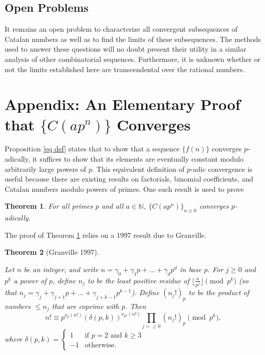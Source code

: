 \documentclass[12pt, letter]{article}    %
\theoremstyle{plain}
\newtheorem{theorem}{Theorem}[section]
\theoremstyle{definition}
\numberwithin{equation}{section}
\newcommand{\thref}[1]{Theorem \ref{#1}}
\newcommand{\propref}[1]{Proposition \ref{#1}}
\newcommand{\thlabel}[1]{\label{#1}}
\begin{document}
\subsection{Open Problems}

It remains an open problem to characterize all convergent subsequences of Catalan numbers as well as to find the limits of these subsequences. The methods used to answer these questions will no doubt present their utility in a similar analysis of other combinatorial sequences. Furthermore, it is unknown whether or not the limits established here are transcendental over the rational numbers.

\section{Appendix: An Elementary Proof that $\{C(ap^n)\}$ Converges}

\propref{eq def} states that to show that a sequence $\{f(n)\}$ converges $p$-adically, it suffices to show that its elements are eventually constant modulo arbitrarily large powers of $p$. This equivalent definition of $p$-adic convergence is useful because there are existing results on factorials, binomial coefficients, and Catalan numbers modulo powers of primes. One such result is used to prove 

\begin{theorem}\thlabel{class thm}
For all primes $p$ and all $a\in\mathbb{N}$, $\{C(ap^n)\}_{n\geq 0}$ converges $p$-adically.
\end{theorem}

\noindent The proof of \thref{class thm} relies on a 1997 result due to Granville.

\begin{theorem}[Granville 1997]\thlabel{granlem1}

Let $n$ be an integer, and write $n=\gamma_0+\gamma_1p+\dots+\gamma_dp^d$ in base $p$. For $j\geq 0$ and $p^k$ a power of $p$, define $n_j$ to be the least positive residue of $\lfloor\frac{n}{p^j}\rfloor\pmod{p^k}$ (so that $n_j=\gamma_j+\gamma_{j+1}p+\dots+\gamma_{j+k-1}p^{k-1}$). Define $(n_j!)_p$ to be the product of numbers $\leq n_j$ that are coprime with $p$. Then $$n!\equiv p^{\nu_p(n!)}(\delta(p,k))^{\nu_{p^k}(n!)}\prod_{j=\geq0}(n_j!)_p \pmod{p^k},$$ where $\delta(p,k)=\begin{cases} 1 &\mbox{if } p=2 \mbox{ and } k\geq 3 \\ -1 &\mbox{otherwise}. \end{cases}$ 
\end{theorem}
\end{document}
